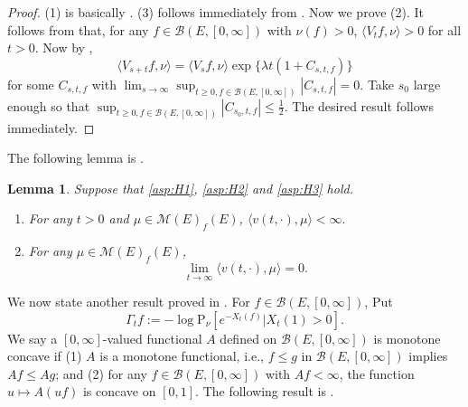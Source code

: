 \documentclass[12pt,a4paper]{amsart}
\numberwithin{equation}{section}
\theoremstyle{plain}
\newtheorem{lem}[thm]{Lemma}
\theoremstyle{definition}
\theoremstyle{remark}
\begin{document}
\begin{proof}
(1) is basically \cite[(3.20)]{LiuRenSongSun2020}. 
	(3) follows immediately from
	\cite[(3.20) and Proposition 1.4]{LiuRenSongSun2020}. 
	Now we prove (2).
	It follows from\cite[(3.4)]{LiuRenSongSun2020} 
	that, for any $f\in\mathcal B(E,[0,\infty])$ with $\nu(f)>0$, $\langle V_{t}f, \nu\rangle>0$ for all $t>0$. 
	Now by \cite[(3.20)]{LiuRenSongSun2020},
	$$
	\langle V_{s+t}f, \nu\rangle=\langle V_{s}f, \nu\rangle\exp\{\lambda t(1+C_{s, t, f})\}
	$$
	for some $C_{s, t, f}$ with $\lim_{s\to\infty}\sup_{t\ge 0, f\in \mathcal B(E,[0,\infty])}|C_{s, t, f}|=0$. Take $s_0$ large enough so that $\sup_{t\ge 0, f\in \mathcal B(E,[0,\infty])}|C_{s_0, t, f}|\le \frac12$. The desired result follows immediately.
\end{proof}

The following lemma is \cite[Proposition 2.2]{LiuRenSongSun2020}.
\begin{lem}\label{lem:extinc}
	Suppose that  \eqref{asp:H1}, \eqref{asp:H2} and \eqref{asp:H3} hold.
	\begin{enumerate}
		\item	
		For any  $ t>0$ and $ \mu \in \mathcal M(E)_f(E)$, $\langle v(t,\cdot),\mu\rangle <\infty.$
		\item	For any $\mu \in \mathcal M(E)_f(E)$,
		\[
		\lim_{t\rightarrow\infty}\langle v(t,\cdot),\mu\rangle=0.
		\]
	\end{enumerate}
\end{lem}

We now state another result
proved in \cite{LiuRenSongSun2020}. For $f\in \mathcal B(E, [0,\infty])$, Put
$$
\Gamma_t f:=-\log \mathrm P_{\nu}[e^{-X_t(f)}|X_t(1)>0].
$$
We say a $[0,\infty]$-valued functional $A$ defined on $\mathcal B(E,[0,\infty])$ is monotone concave if
	(1) $A$ is a monotone functional, i.e., $f\leq g$ in $\mathcal B(E,[0,\infty])$ implies $Af \leq Ag$; and
	(2) for any $f\in \mathcal B(E,[0,\infty])$ with $Af< \infty$, the function $u \mapsto A(uf)$ is concave on $[0,1]$.
The following result is \cite[Propositions 2.3 and 2.7]{LiuRenSongSun2020}.
\end{document}
